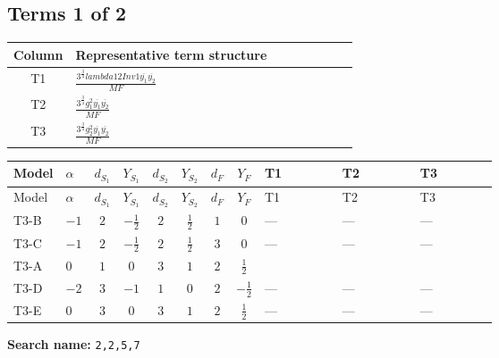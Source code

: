 \documentclass[8pt]{article}
\begin{document}
\begin{landscape}
\subsection*{Terms 1 of 2}
\begin{center}
\begin{tabular}{@{}c >{\raggedright\arraybackslash}p{0.82\linewidth}@{}}
\toprule
Column & Representative term structure \\
\midrule
T1 & \(\displaystyle \frac{3^{\frac{3}{4}} lambda12Inv1 \overline{y_{1}} \overline{y_{2}}}{MF}\) \\
\midrule
T2 & \(\displaystyle \frac{3^{\frac{3}{4}} g_{1}^{2} \overline{y_{1}} \overline{y_{2}}}{MF}\) \\
\midrule
T3 & \(\displaystyle \frac{3^{\frac{3}{4}} g_{2}^{2} \overline{y_{1}} \overline{y_{2}}}{MF}\) \\
\midrule
\bottomrule
\end{tabular}
\end{center}
\smallskip
\tiny
\begin{longtable}{@{}llcccccc >{\raggedright\arraybackslash}p{0.21\linewidth} >{\raggedright\arraybackslash}p{0.21\linewidth} >{\raggedright\arraybackslash}p{0.21\linewidth}@{}}
\toprule
Model & $\alpha$ & $d_{S_1}$ & $Y_{S_1}$ & $d_{S_2}$ & $Y_{S_2}$ & $d_F$ & $Y_F$ & T1 & T2 & T3 \\
\midrule
\endfirsthead
\toprule
Model & $\alpha$ & $d_{S_1}$ & $Y_{S_1}$ & $d_{S_2}$ & $Y_{S_2}$ & $d_F$ & $Y_F$ & T1 & T2 & T3 \\
\midrule
\endhead
T3-B & $-1$ & $2$ & $-\frac{1}{2}$ & $2$ & $\frac{1}{2}$ & $1$ & $0$ & --- & --- & --- \\
\midrule
T3-C & $-1$ & $2$ & $-\frac{1}{2}$ & $2$ & $\frac{1}{2}$ & $3$ & $0$ & --- & --- & --- \\
\midrule
T3-A & $0$ & $1$ & $0$ & $3$ & $1$ & $2$ & $\frac{1}{2}$ & \scriptsize\adjustbox{max width=\linewidth}{$\begin{gathered} \frac{3^{\frac{3}{4}} lambda12Inv1 \overline{y_{1}} \overline{y_{2}}}{6 MF}\end{gathered}$} & \scriptsize\adjustbox{max width=\linewidth}{$\begin{gathered} \frac{3^{\frac{3}{4}} g_{1}^{2} \overline{y_{1}} \overline{y_{2}}}{8 MF}\end{gathered}$} & \scriptsize\adjustbox{max width=\linewidth}{$\begin{gathered} \frac{17 \cdot 3^{\frac{3}{4}} g_{2}^{2} \overline{y_{1}} \overline{y_{2}}}{24 MF}\end{gathered}$} \\
\midrule
T3-D & $-2$ & $3$ & $-1$ & $1$ & $0$ & $2$ & $-\frac{1}{2}$ & --- & --- & --- \\
\midrule
T3-E & $0$ & $3$ & $0$ & $3$ & $1$ & $2$ & $\frac{1}{2}$ & --- & --- & --- \\
\midrule
\bottomrule
\end{longtable}
\clearpage
\noindent\textbf{Search name: }\texttt{2,2,5,7}\par\smallskip

\end{landscape}
\end{document}
